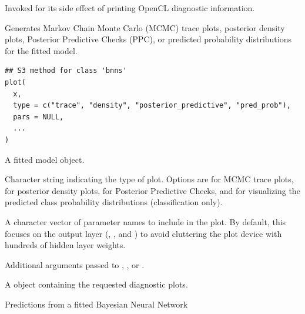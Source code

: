 \documentclass[a4paper]{book}
\begin{document}
%
\begin{Value}
Invoked for its side effect of printing OpenCL diagnostic information.
\end{Value}
%
\begin{Description}
Generates Markov Chain Monte Carlo (MCMC) trace plots, posterior density plots,
Posterior Predictive Checks (PPC), or predicted probability distributions for the fitted model.
\end{Description}
%
\begin{Usage}
\begin{verbatim}
## S3 method for class 'bnns'
plot(
  x,
  type = c("trace", "density", "posterior_predictive", "pred_prob"),
  pars = NULL,
  ...
)
\end{verbatim}
\end{Usage}
%
\begin{Arguments}
\begin{ldescription}
\item[\code{x}] A fitted  model object.

\item[\code{type}] Character string indicating the type of plot.
Options are  for MCMC trace plots,  for posterior density plots,
 for Posterior Predictive Checks, and  for
visualizing the predicted class probability distributions (classification only).

\item[\code{pars}] A character vector of parameter names to include in the plot.
By default, this focuses on the output layer (, , and )
to avoid cluttering the plot device with hundreds of hidden layer weights.

\item[\code{...}] Additional arguments passed to , ,
or .
\end{ldescription}
\end{Arguments}
%
\begin{Value}
A  object containing the requested diagnostic plots.
\end{Value}
%
\begin{Description}
Predictions from a fitted Bayesian Neural Network
\end{Description}
\end{document}
